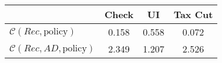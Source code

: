 \begin{tabular}{@{}lccc@{}} 
\toprule 
                          & Check      & UI    & Tax Cut    \\  \midrule 
$\mathcal{C}(Rec,\text{policy})$ & 0.158  & 0.558  & 0.072     \\ 
$\mathcal{C}(Rec, AD,\text{policy})$ & 2.349  & 1.207  & 2.526     \\ 
\end{tabular}  
